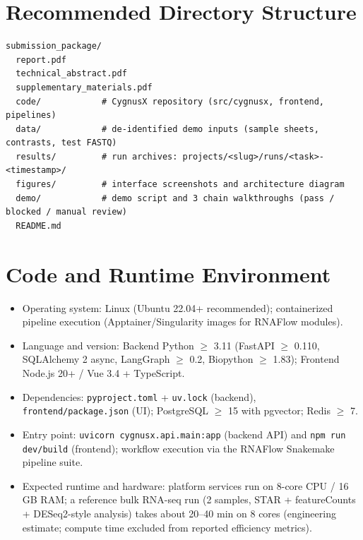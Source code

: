 \documentclass[11pt,a4paper]{article}
\begin{document}
\section{Recommended Directory Structure}
\begin{verbatim}
submission_package/
  report.pdf
  technical_abstract.pdf
  supplementary_materials.pdf
  code/            # CygnusX repository (src/cygnusx, frontend, pipelines)
  data/            # de-identified demo inputs (sample sheets, contrasts, test FASTQ)
  results/         # run archives: projects/<slug>/runs/<task>-<timestamp>/
  figures/         # interface screenshots and architecture diagram
  demo/            # demo script and 3 chain walkthroughs (pass / blocked / manual review)
  README.md
\end{verbatim}

\section{Code and Runtime Environment}
\begin{itemize}
  \item Operating system: Linux (Ubuntu 22.04+ recommended); containerized pipeline execution (Apptainer/Singularity images for RNAFlow modules).
  \item Language and version: Backend Python $\geq$ 3.11 (FastAPI $\geq$ 0.110, SQLAlchemy 2 async, LangGraph $\geq$ 0.2, Biopython $\geq$ 1.83); Frontend Node.js 20+ / Vue 3.4 + TypeScript.
  \item Dependencies: \texttt{pyproject.toml} + \texttt{uv.lock} (backend), \texttt{frontend/package.json} (UI); PostgreSQL $\geq$ 15 with pgvector; Redis $\geq$ 7.
  \item Entry point: \texttt{uvicorn cygnusx.api.main:app} (backend API) and \texttt{npm run dev/build} (frontend); workflow execution via the RNAFlow Snakemake pipeline suite.
  \item Expected runtime and hardware: platform services run on 8-core CPU / 16 GB RAM; a reference bulk RNA-seq run (2 samples, STAR + featureCounts + DESeq2-style analysis) takes about 20--40 min on 8 cores (engineering estimate; compute time excluded from reported efficiency metrics).
\end{itemize}
\end{document}
